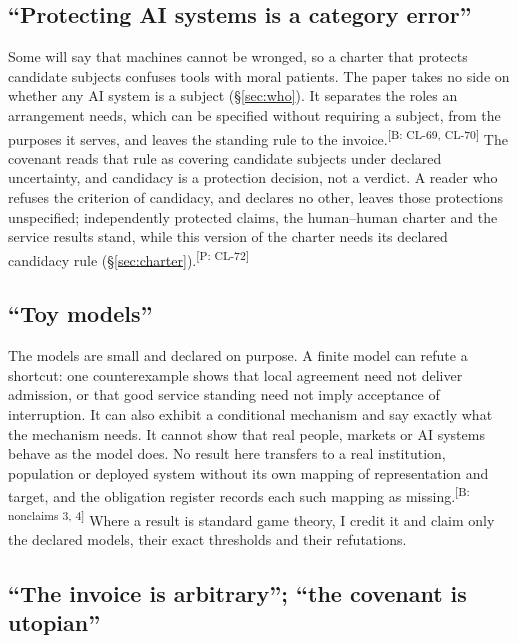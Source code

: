 \documentclass[pdflatex,sn-basic]{sn-jnl}%
\newcommand{\slot}[1]{}%
\newcommand{\claim}[2]{\ifannotated\textsuperscript{\textcolor{blue!60!black}{\tiny[#1: #2]}}\fi}
\newcommand{\enquote}[1]{``#1''}
\begin{document}
\subsection{\enquote{Protecting AI systems is a category error}}

\slot{10.2}
Some will say that machines cannot be wronged, so a charter that protects candidate subjects confuses tools with moral patients. The paper takes no side on whether any AI system is a subject (\S\ref{sec:who}). It separates the roles an arrangement needs, which can be specified without requiring a subject, from the purposes it serves, and leaves the standing rule to the invoice.\claim{B}{CL-69, CL-70} The covenant reads that rule as covering candidate subjects under declared uncertainty, and candidacy is a protection decision, not a verdict. A reader who refuses the criterion of candidacy, and declares no other, leaves those protections unspecified; independently protected claims, the human--human charter and the service results stand, while this version of the charter needs its declared candidacy rule (\S\ref{sec:charter}).\claim{P}{CL-72}

\subsection{\enquote{Toy models}}

\slot{10.3}
The models are small and declared on purpose. A finite model can refute a shortcut: one counterexample shows that local agreement need not deliver admission, or that good service standing need not imply acceptance of interruption. It can also exhibit a conditional mechanism and say exactly what the mechanism needs. It cannot show that real people, markets or AI systems behave as the model does. No result here transfers to a real institution, population or deployed system without its own mapping of representation and target, and the obligation register records each such mapping as missing.\claim{B}{nonclaims 3, 4} Where a result is standard game theory, I credit it and claim only the declared models, their exact thresholds and their refutations.

\subsection{\enquote{The invoice is arbitrary}; \enquote{the covenant is utopian}}
\end{document}
